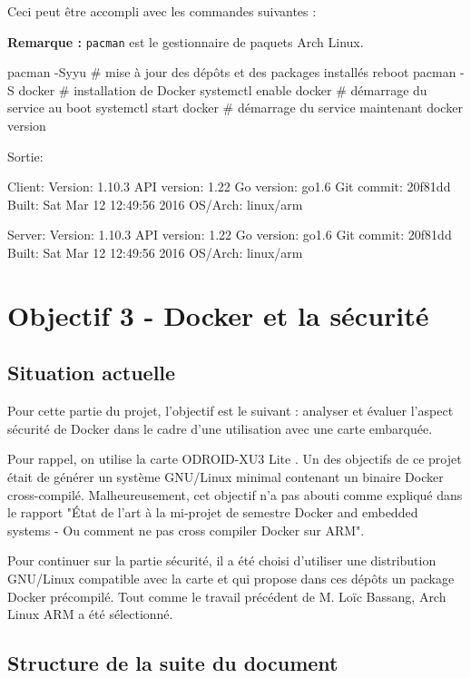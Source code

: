 \documentclass[11pt,a4paper,oneside]{report}
\newcommand{\code}[1]{\texttt{#1}}
\newcommand{\oldreportname}{État de l’art à la mi-projet de semestre Docker and embedded systems - Ou comment ne pas cross compiler Docker sur ARM}
\newcommand{\odroid}{ODROID-XU3 Lite }
\begin{document}
Ceci peut être accompli avec les commandes suivantes :

\textbf{Remarque :} \code{pacman} est le gestionnaire de paquets Arch Linux.

\begin{bashcode}
pacman -Syyu # mise à jour des dépôts et des packages installés
reboot
pacman -S docker # installation de Docker
systemctl enable docker # démarrage du service au boot
systemctl start docker # démarrage du service maintenant
docker version
\end{bashcode}

Sortie:

\begin{bashcode}
Client:
 Version:      1.10.3
 API version:  1.22
 Go version:   go1.6
 Git commit:   20f81dd
 Built:        Sat Mar 12 12:49:56 2016
 OS/Arch:      linux/arm

Server:
 Version:      1.10.3
 API version:  1.22
 Go version:   go1.6
 Git commit:   20f81dd
 Built:        Sat Mar 12 12:49:56 2016
 OS/Arch:      linux/arm
 \end{bashcode}


\chapter{Objectif 3 - Docker et la sécurité}

\section{Situation actuelle}
Pour cette partie du projet, l'objectif est le suivant : analyser et évaluer l'aspect sécurité de Docker dans le cadre d'une utilisation avec une carte embarquée.

Pour rappel, on utilise la carte \odroid. Un des objectifs de ce projet était de générer un système GNU/Linux minimal contenant un binaire Docker cross-compilé. Malheureusement, cet objectif n'a pas abouti comme expliqué dans le rapport "\oldreportname".

Pour continuer sur la partie sécurité, il a été choisi d'utiliser une distribution GNU/Linux compatible avec la carte et qui propose dans ces dépôts un package Docker précompilé. Tout comme le travail précédent de M. Loïc Bassang, Arch Linux ARM a été sélectionné.

\section{Structure de la suite du document}
\end{document}

